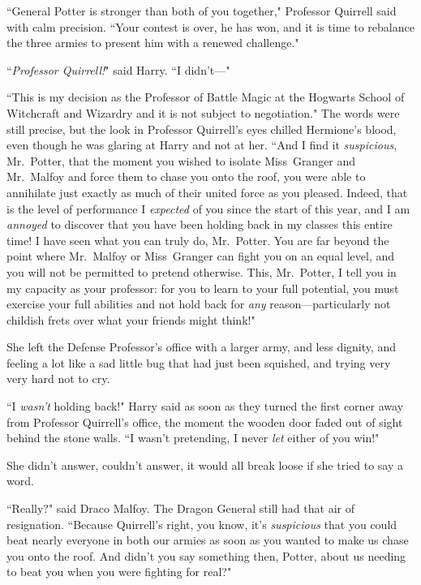 ``General Potter is stronger than both of you together," Professor Quirrell said with calm precision. ``Your contest is over, he has won, and it is time to rebalance the three armies to present him with a renewed challenge."

``\emph{Professor Quirrell!}" said Harry. ``I didn't—"

``This is my decision as the Professor of Battle Magic at the Hogwarts School of Witchcraft and Wizardry and it is not subject to negotiation." The words were still precise, but the look in Professor Quirrell's eyes chilled Hermione's blood, even though he was glaring at Harry and not at her. ``And I find it \emph{suspicious}, Mr.~Potter, that the moment you wished to isolate Miss~Granger and Mr.~Malfoy and force them to chase you onto the roof, you were able to annihilate just exactly as much of their united force as you pleased. Indeed, that is the level of performance I \emph{expected} of you since the start of this year, and I am \emph{annoyed} to discover that you have been holding back in my classes this entire time! I have seen what you can truly do, Mr.~Potter. You are far beyond the point where Mr.~Malfoy or Miss~Granger can fight you on an equal level, and you will not be permitted to pretend otherwise. This, Mr.~Potter, I tell you in my capacity as your professor: for you to learn to your full potential, you must exercise your full abilities and not hold back for \emph{any} reason—particularly not childish frets over what your friends might think!"

\later

She left the Defense Professor's office with a larger army, and less dignity, and feeling a lot like a sad little bug that had just been squished, and trying very very hard not to cry.

``I \emph{wasn't} holding back!" Harry said as soon as they turned the first corner away from Professor Quirrell's office, the moment the wooden door faded out of sight behind the stone walls. ``I wasn't pretending, I never \emph{let} either of you win!"

She didn't answer, couldn't answer, it would all break loose if she tried to say a word.

``Really?" said Draco Malfoy. The Dragon General still had that air of resignation. ``Because Quirrell's right, you know, it's \emph{suspicious} that you could beat nearly everyone in both our armies as soon as you wanted to make us chase you onto the roof. And didn't you say something then, Potter, about us needing to beat you when you were fighting for real?"

